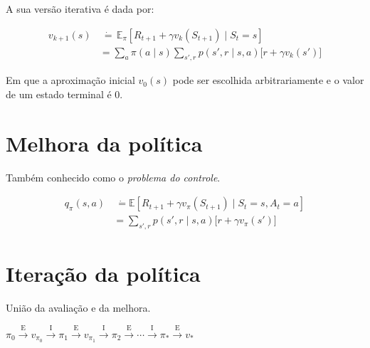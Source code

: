 \documentclass{article}
\begin{document}
            A sua versão iterativa é dada por:
            
            \begin{equation}
                \begin{split}
                    v_{k+1}(s) & \ \dot{=} \, \mathbb{E}_{\pi} \left[ R_{t+1} + \gamma v_k(S_{t+1}) \mid S_t = s \right] \\
                    & = \sum_a \pi(a \mid s) \sum_{s',r} p(s',r \mid s,a) \Big[ r + \gamma v_k(s') \Big]
                \end{split}
            \end{equation}
            
            Em que a aproximação inicial $v_0(s)$ pode ser escolhida arbitrariamente e o valor de um estado terminal é $0$.
        
    \section{Melhora da política}
    
        Também conhecido como o \textit{problema do controle}.
        
        \begin{equation}
            \begin{split}
                q_{\pi}(s,a) & \ \dot{=} \mathbb{E} \left[ R_{t+1} + \gamma v_{\pi}(S_{t+1}) \mid S_t = s, A_t = a \right] \\
                & = \sum_{s',r} p(s', r \mid s, a) \Big[ r + \gamma v_{\pi}(s') \Big]
            \end{split}
        \end{equation}
    
    \section{Iteração da política}
    
        União da avaliação e da melhora.
        
        \begin{center}
            \begin{math}
                \pi_0 \xrightarrow{\ \textrm{E} \ } 
                v_{\pi_0} \xrightarrow{\ \textrm{I} \ } 
                \pi_1 \xrightarrow{\ \textrm{E} \ } 
                v_{\pi_1} \xrightarrow{\ \textrm{I} \ } 
                \pi_2 \xrightarrow{\ \textrm{E} \ } 
                \cdots \xrightarrow{\ \textrm{I} \ }
                \pi_* \xrightarrow{\ \textrm{E} \ } v_{*}
            \end{math}
        \end{center}
        
\end{document}
